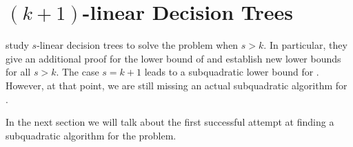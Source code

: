 \section{$(k+1)$-linear Decision Trees}

\citet*{ailon:2005} study $s$-linear decision trees to solve the \kSUM
problem when $s > k$. In particular, they give an additional proof for the
 lower bound of \citet{erickson:1999} and
establish new lower bounds for all $s > k$. The case $s = k+1$ leads to a
subquadratic lower bound for \threeSUM. However, at that point, we are still
missing an actual subquadratic algorithm for \threeSUM.

In the next section we will talk about the first successful attempt at finding
a subquadratic algorithm for the \threeSUM problem.
